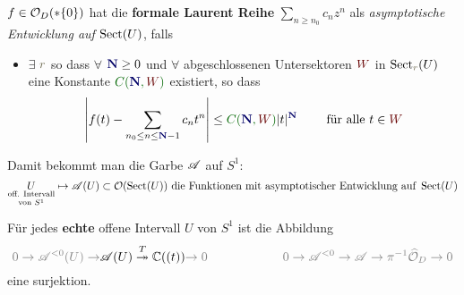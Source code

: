 \begin{defn}
  \def\myN{\textbf{\textcolor{blue!40!black}{N}}}
  \def\mySect{\textcolor{red!40!black}{W}}
  \def\myConst{\textcolor{green!40!black}{C(\myN,\mySect)}}
  $f\in\mathcal{O}_D(*\{0\})$ hat die \textbf{formale Laurent Reihe}
  $\sum_{n\geq n_0}c_nz^n$ als \emph{asymptotische Entwicklung auf
  $\operatorname{Sect}(U)$}, falls
  \begin{itemize}
    \item $\exists$ $\textcolor{yellow!30!black}{r}$ so dass
      $\forall$ $\myN\geq0$ und
      $\forall$ abgeschlossenen Untersektoren $\mySect$ in
      $\Sect_{\textcolor{yellow!30!black}{r}}(U)$
      \\eine Konstante $\myConst$ existiert, so dass
      \[
        \left|
          f(t)-\sum_{n_0\leq n\leq\myN-1}c_nt^n
        \right|
        \leq \myConst|t|^{\myN} \qquad \text{ für alle } t\in \mySect
      \]

      \begin{comment}
        oder äquivalent:
        $\lim_{z\to0,z\in{\mySect}}|t|^{-(\myN-1)}
          \left|
            f(t)-\sum_{n_0\leq n\leq \myN-1}c_nt^n
          \right|=0$
      \end{comment}
  \end{itemize}
  Damit bekommt man die Garbe $\mathscr{A}$ auf $S^1$:
  \[
    \underset{\text{von } S^1}{\underset{\text{off. Intervall}}{U}}
    \mapsto\mathscr{A}(U)
    \subset\mathcal{O}(\operatorname{Sect}(U)) \text{ die Funktionen mit asymptotischer
    Entwicklung auf } \operatorname{Sect}(U)
  \]
\end{defn}
\begin{llem}
  Für jedes \textbf{echte} offene Intervall $U$ von $S^1$ ist die Abbildung
  \[
    \textcolor{gray}{0\to \sA^{<0}(U) \to}
    \sA(U) \overset{T}\twoheadrightarrow \C((t))
    \textcolor{gray}{\to0}
    \qquad
    \qquad
    \qquad
    \textcolor{gray}{0\to \sA^{<0} \to
    \sA \to \pi^{-1}\hat\cO_{D}
    \to0}
  \]
  eine surjektion.
\end{llem}
